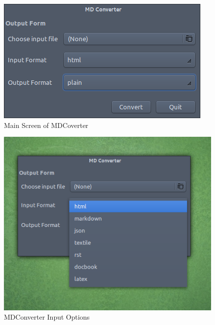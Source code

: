 \begin{figure}[h]
\begin{center}
  \includegraphics[scale=0.89] {24.png}
  \caption[Screenshot - MDConverter Main Screen]{Main Screen of MDCoverter}
\end{center}
\end{figure}
\begin{figure}[h]
\begin{center}
  \includegraphics[scale=0.89] {25.png}
  \caption[Screenshot - MDConverter Input Options]{MDConverter Input Options}
\end{center}
\end{figure}
